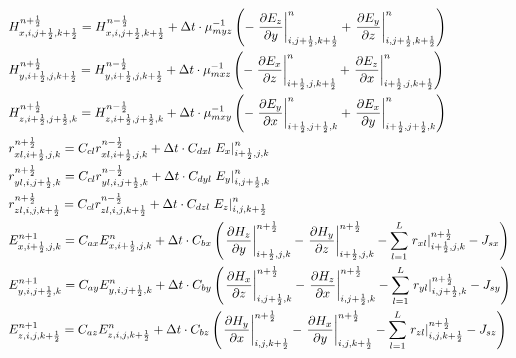 \documentclass[pdftex,a4paper,parskip,listof=totoc,bibliography=totoc,onehalfspacing,12pt]{scrreprt}
\begin{document}
\begin{equation}
\begin{aligned}
  &H_{x,i,j+\frac{1}{2},k+\frac{1}{2}}^{n+\frac{1}{2}} = H_{x,i,j+\frac{1}{2},k+\frac{1}{2}}^{n-\frac{1}{2}} + \Delta t \cdot \mu_{myz}^{-1}  \left(- \left.\pdv{ E_{z}}{y}\right\rvert_{i,j+\frac{1}{2},k+\frac{1}{2}}^{n} + \left.\pdv{ E_{y}}{z}\right\rvert_{i,j+\frac{1}{2},k+\frac{1}{2}}^{n} \right)\\
  &H_{y,i+\frac{1}{2},j,k+\frac{1}{2}}^{n+\frac{1}{2}} = H_{y,i+\frac{1}{2},j,k+\frac{1}{2}}^{n-\frac{1}{2}} + \Delta t \cdot \mu_{mxz}^{-1}  \left(- \left.\pdv{ E_{x}}{z}\right\rvert_{i+\frac{1}{2},j,k+\frac{1}{2}}^{n} + \left.\pdv{ E_z}{x}\right\rvert_{i+\frac{1}{2},j,k+\frac{1}{2}}^{n} \right)\\
  &H_{z,i+\frac{1}{2},j+\frac{1}{2},k}^{n+\frac{1}{2}} = H_{z,i+\frac{1}{2},j+\frac{1}{2},k}^{n-\frac{1}{2}} + \Delta t \cdot \mu_{mxy}^{-1}  \left(- \left.\pdv{ E_y}{x}\right\rvert_{i+\frac{1}{2},j+\frac{1}{2},k}^{n} + \left.\pdv{ E_x}{y}\right\rvert_{i+\frac{1}{2},j+\frac{1}{2},k}^{n} \right)\\
  &r_{xl,i+\frac{1}{2},j,k}^{n+\frac{1}{2}} = C_{c l} r_{xl,i+\frac{1}{2},j,k}^{n-\frac{1}{2}} + \Delta t \cdot C_{d x l} \left.E_x \right\rvert_{i+\frac{1}{2},j,k}^{n}\\
  &r_{yl,i,j+\frac{1}{2},k}^{n+\frac{1}{2}} = C_{c l} r_{yl,i,j+\frac{1}{2},k}^{n-\frac{1}{2}} + \Delta t \cdot C_{d y l} \left.E_y \right\rvert_{i,j+\frac{1}{2},k}^{n}\\
  &r_{zl,i,j,k+\frac{1}{2}}^{n+\frac{1}{2}} = C_{c l} r_{zl,i,j,k+\frac{1}{2}}^{n-\frac{1}{2}} + \Delta t \cdot C_{d z l} \left.E_z \right\rvert_{i,j,k+\frac{1}{2}}^{n}\\
  &E_{x,i+\frac{1}{2},j,k}^{n+1} = C_{ax} E_{x,i+\frac{1}{2},j,k}^{n} + \Delta t \cdot C_{bx} \left( \left.\pdv{ H_z}{y}\right\rvert_{i+\frac{1}{2},j,k}^{n+\frac{1}{2}} - \left.\pdv{ H_y}{z}\right\rvert_{i+\frac{1}{2},j,k}^{n+\frac{1}{2}} - \sum_{l=1}^L \left.r_{xl}\right\rvert_{i+\frac{1}{2},j,k}^{n+\frac{1}{2}} - J_{sx} \right)\\ 
  &E_{y,i,j+\frac{1}{2},k}^{n+1} = C_{ay} E_{y,i,j+\frac{1}{2},k}^{n} + \Delta t \cdot C_{by} \left( \left.\pdv{ H_x}{z}\right\rvert_{i,j+\frac{1}{2},k}^{n+\frac{1}{2}} - \left.\pdv{ H_z}{x}\right\rvert_{i,j+\frac{1}{2},k}^{n+\frac{1}{2}} - \sum_{l=1}^L \left.r_{yl}\right\rvert_{i,j+\frac{1}{2},k}^{n+\frac{1}{2}} - J_{sy} \right)\\
  &E_{z,i,j,k+\frac{1}{2}}^{n+1} = C_{az} E_{z,i,j,k+\frac{1}{2}}^{n} + \Delta t \cdot C_{bz} \left( \left.\pdv{ H_y}{x}\right\rvert_{i,j,k+\frac{1}{2}}^{n+\frac{1}{2}} - \left.\pdv{ H_x}{y}\right\rvert_{i,j,k+\frac{1}{2}}^{n+\frac{1}{2}} - \sum_{l=1}^L \left.r_{zl}\right\rvert_{i,j,k+\frac{1}{2}}^{n+\frac{1}{2}} - J_{sz} \right)
\end{aligned}
\end{equation}
\end{document}
